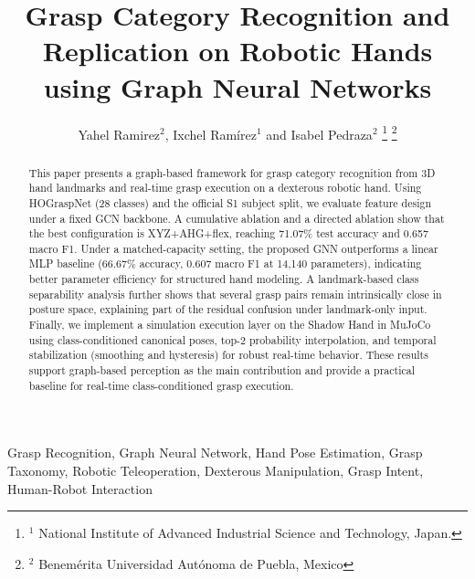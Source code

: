 \documentclass[letterpaper, 10 pt, conference]{ieeeconf}  %
\title{\LARGE \bf
Grasp Category Recognition and Replication on Robotic Hands using Graph Neural Networks}
\author{ Yahel Ramirez$^{2}$, Ixchel Ramírez$^{1}$ and  Isabel Pedraza$^{2}$
\thanks{$^{1}$ National Institute of Advanced Industrial Science and Technology, Japan.}%
\thanks{$^{2}$ Benemérita Universidad Autónoma de Puebla, Mexico}%
}
\begin{document}

\maketitle
\thispagestyle{empty}
\pagestyle{empty}


\begin{abstract}
This paper presents a graph-based framework for grasp category recognition from 3D hand landmarks and real-time grasp execution on a dexterous robotic hand. Using HOGraspNet (28 classes) and the official S1 subject split, we evaluate feature design under a fixed GCN backbone. A cumulative ablation and a directed ablation show that the best configuration is XYZ+AHG+flex, reaching 71.07\% test accuracy and 0.657 macro F1. Under a matched-capacity setting, the proposed GNN outperforms a linear MLP baseline (66.67\% accuracy, 0.607 macro F1 at 14,140 parameters), indicating better parameter efficiency for structured hand modeling. A landmark-based class separability analysis further shows that several grasp pairs remain intrinsically close in posture space, explaining part of the residual confusion under landmark-only input. Finally, we implement a simulation execution layer on the Shadow Hand in MuJoCo using class-conditioned canonical poses, top-2 probability interpolation, and temporal stabilization (smoothing and hysteresis) for robust real-time behavior. These results support graph-based perception as the main contribution and provide a practical baseline for real-time class-conditioned grasp execution.
\end{abstract}


\begin{keywords}
Grasp Recognition, Graph Neural Network, Hand Pose Estimation, Grasp Taxonomy, Robotic Teleoperation, Dexterous Manipulation, Grasp Intent, Human-Robot Interaction
\end{keywords}

\end{document}

